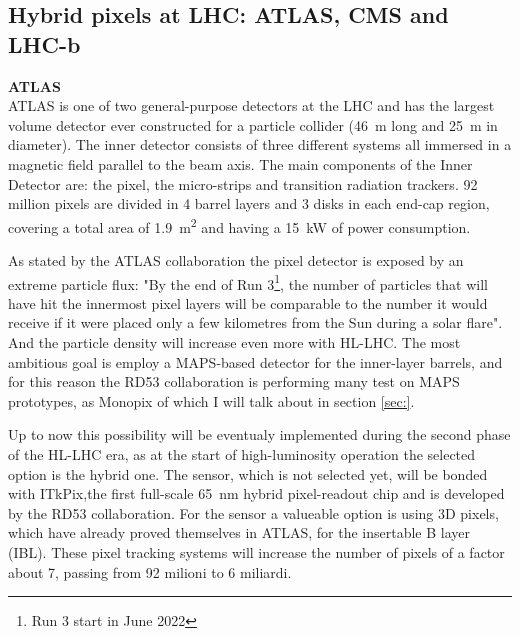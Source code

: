     \subsection{Hybrid pixels at LHC: ATLAS, CMS and LHC-b}
        \textbf{ATLAS}\\
        ATLAS is one of two general-purpose detectors at the LHC and has the largest volume detector ever constructed for a particle
        collider (\SI{46}{m} long and \SI{25}{m} in diameter).  
        The inner detector consists of three different systems all immersed in a magnetic field parallel to the beam axis. The main components of the Inner Detector are: the pixel, the micro-strips and transition radiation trackers. 92 million pixels are divided in 4 barrel layers and 3 disks in each end-cap region, covering a total area of \SI{1.9}{m\squared} and having a \SI{15}{kW} of power consumption.

        As stated by the ATLAS collaboration the pixel detector is exposed by an extreme particle flux: "By the end of Run 3\footnote{Run 3 start in June 2022}, the number of particles that will have hit the innermost pixel layers will be comparable to the number it would receive if it were placed only a few kilometres from the Sun during a solar flare". And the particle density will increase even more with HL-LHC. 
        The most ambitious goal is employ a MAPS-based detector for the inner-layer barrels, and for this reason the RD53 collaboration is performing many test on MAPS prototypes, as Monopix of which I will talk about in section \ref{sec:}.
        
        Up to now this possibility will be eventualy implemented during the second phase of the HL-LHC era, as at the start of high-luminosity operation the selected option is the hybrid one. The sensor, which is not selected yet, will be bonded with ITkPix,the first full-scale \SI{65}{nm} hybrid pixel-readout chip and is developed by the RD53 collaboration.
        For the sensor a valueable option is using 3D pixels, which have already proved themselves in ATLAS, for the insertable B layer (IBL).
        These pixel tracking systems will increase the number of pixels of a factor about 7, passing from 92 milioni to 6 miliardi. 

        \vspace{5mm}
        
